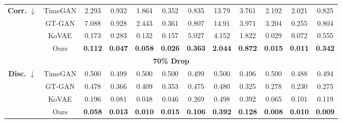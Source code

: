 \documentclass{article}
\theoremstyle{plain}
\theoremstyle{definition}
\theoremstyle{remark}
\begin{document}
{\begin{table*}[!t]
{\begin{tabular}{cc|cccccccccc}
    \multirow{4}{*}{\textbf{Corr.} $\downarrow$} 
      & TimeGAN 
         & 2.293 
         & 0.932 
         & 1.864 
         & 0.352 
         & 0.835 
         & 13.79 
         & 3.761 
         & 2.192 
         & 2.021 
         & 0.825 \\
      & GT-GAN  
         & 7.088 
         & 0.928 
         & 2.443 
         & 0.361 
         & 0.807 
         & 14.91 
         & 3.971 
         & 3.204 
         & 0.255 
         & 0.804 \\
      & KoVAE   
         & 0.173 
         & 0.283 
         & 0.132 
         & 0.157 
         & 5.027 
         & 4.152 
         & 1.822 
         & 0.029 
         & 0.072 
         & 0.555 \\
      & Ours    
         & \cellcolor{blue!10}\textbf{0.112}
         & \cellcolor{blue!10}\textbf{0.047}
         & \cellcolor{blue!10}\textbf{0.058}
         & \cellcolor{blue!10}\textbf{0.026}
         & \cellcolor{blue!10}\textbf{0.363}
         & \cellcolor{blue!10}\textbf{2.044}
         & \cellcolor{blue!10}\textbf{0.872}
         & \cellcolor{blue!10}\textbf{0.015}
         & \cellcolor{blue!10}\textbf{0.011}
         & \cellcolor{blue!10}\textbf{0.342} \\
    \midrule
    
    \multicolumn{12}{c}{\textbf{70\% Drop}} \\[3pt] 
    \midrule
    \multirow{4}{*}{\textbf{Disc.} $\downarrow$} 
      & TimeGAN 
         & 0.500 
         & 0.499 
         & 0.500 
         & 0.500 
         & 0.499 
         & 0.500 
         & 0.496 
         & 0.500 
         & 0.488 
         & 0.494 \\
      & GT-GAN  
         & 0.478 
         & 0.366 
         & 0.409 
         & 0.353 
         & 0.475 
         & 0.480 
         & 0.325 
         & 0.278 
         & 0.230 
         & 0.275 \\
      & KoVAE   
         & 0.196 
         & 0.081 
         & 0.048 
         & 0.046 
         & 0.269 
         & 0.498 
         & 0.392 
         & 0.065 
         & 0.101 
         & 0.119 \\
      & Ours    
         & \cellcolor{blue!10}\textbf{0.058}
         & \cellcolor{blue!10}\textbf{0.013}
         & \cellcolor{blue!10}\textbf{0.010}
         & \cellcolor{blue!10}\textbf{0.015}
         & \cellcolor{blue!10}\textbf{0.106}
         & \cellcolor{blue!10}\textbf{0.392}
         & \cellcolor{blue!10}\textbf{0.128}
         & \cellcolor{blue!10}\textbf{0.008}
         & \cellcolor{blue!10}\textbf{0.010}
         & \cellcolor{blue!10}\textbf{0.009} \\
    \midrule
    

\end{tabular}}
\end{table*}}
\end{document}
